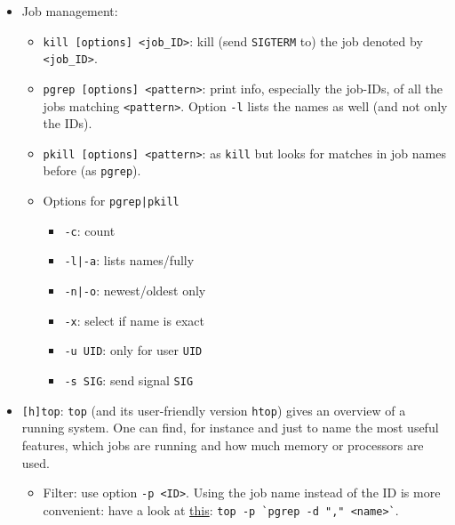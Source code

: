 \documentclass[a4paper,12pt,%
              final%
              ]{article}
\begin{document}
\begin{itemize}
\begin{itemize}
      \item In fact, under the hood \texttt{pdfjam} calls \LaTeX{} and loads the pdf into a page. This is enough most of the time, however, if the pdf has non-standard dimensions, let say smaller than A4, this will result in a blank A4 page with the pdf at the center. To fit to the size, use \texttt{ghostscript} (for the pages, the option \texttt{-sPageList} is also available and accepts ranges)
    \end{itemize}
\begin{verbatim}
gs -dBATCH -dNOPAUSE -dSAFER -sDEVICE=pdfwrite -dPSFitPage \
   -dFirstPage=2 -dLastPage=5 -o out.pdf in.pdf
\end{verbatim}
  \item Job management:
    \begin{itemize}
      \item \verb|kill [options] <job_ID>|: kill (send \texttt{SIGTERM} to) the job denoted by \verb|<job_ID>|.
      \item \verb|pgrep [options] <pattern>|: print info, especially the job-IDs, of all the jobs matching \verb|<pattern>|. Option \verb|-l| lists the names as well (and not only the IDs).
      \item \verb|pkill [options] <pattern>|: as \verb|kill| but looks for matches in job names before (as \verb|pgrep|).
      \item Options for \verb!pgrep|pkill!
        \begin{itemize}
          \item \verb|-c|: count
          \item \verb!-l|-a!: lists names/fully
          \item \verb!-n|-o!: newest/oldest only
          \item \verb|-x|: select if name is exact
          \item \verb|-u UID|: only for user \verb|UID|
          \item \verb|-s SIG|: send signal \verb|SIG|
        \end{itemize}
    \end{itemize}
  \item \verb|[h]top|: \verb|top| (and its user-friendly version \verb|htop|) gives an overview of a running system. One can find, for instance and just to name the most useful features, which jobs are running and how much memory or processors are used.
    \begin{itemize}
      \item Filter: use option \verb|-p <ID>|. Using the job name instead of the ID is more convenient: have a look at \href{https://unix.stackexchange.com/a/347544}{this}: \verb|top -p `pgrep -d "," <name>`|.

\end{itemize}
\end{itemize}
\end{document}
